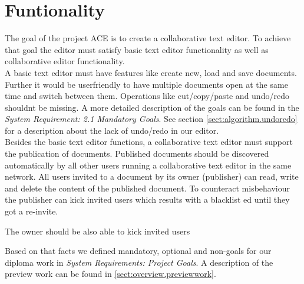 \chapter{Funtionality}
\label{chapter:functionality}

The goal of the project ACE is to create a collaborative text editor. To achieve that goal the editor must satisfy basic text editor functionality as well as collaborative editor functionality. \\

A basic text editor must have features like create new, load and save documents. Further it would be userfriendly to have multiple documents open at the same time and switch between them. Operations like cut/copy/paste and undo/redo shouldnt be missing. A more detailed description of the goals can be found in the \textit{System Requirement: 2.1 Mandatory Goals}. See section \ref{sect:algorithm.undoredo} for a description about the lack of undo/redo in our editor.\\

Besides the basic text editor functions, a collaborative text editor must support the publication of documents. Published documents should be discovered automatically by all other users running a collaborative text editor in the same network. All users invited to a document by its owner (publisher) can read, write and delete the content of the published document. To counteract misbehaviour the publisher can kick invited users which results with a blacklist ed until they got a re-invite.

The owner should be also able to kick invited users 


Based on that facts we defined mandatory, optional and non-goals for our diploma work in \textit{System Requirements: Project Goals}. A description of the preview work can be found in \ref{sect:overview.previewwork}.
